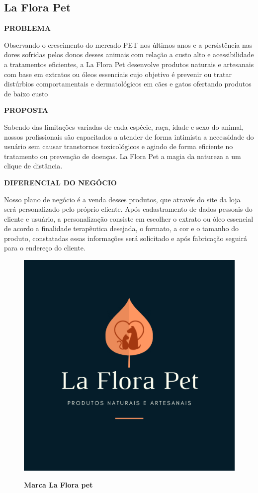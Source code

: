 \subsection{La Flora Pet}

\textbf{PROBLEMA}

Observando o crescimento do mercado PET nos últimos anos e a persistência nas dores sofridas pelos donos desses animais com relação a custo alto e acessibilidade a tratamentos eficientes, a La Flora Pet desenvolve produtos naturais e artesanais com base em extratos ou óleos essenciais cujo objetivo é prevenir ou tratar distúrbios comportamentais e dermatológicos em cães e gatos ofertando produtos de baixo custo

\textbf{PROPOSTA}

Sabendo das limitações variadas de cada espécie, raça, idade e sexo do animal, nossos profissionais são capacitados a atender de forma intimista a necessidade do usuário sem causar transtornos toxicológicos e agindo de forma eficiente no tratamento ou prevenção de doenças. La Flora Pet a magia da natureza a um clique de distância.

\textbf{DIFERENCIAL DO NEGÓCIO} 

Nosso plano de negócio é a venda desses produtos, que através do site da loja será personalizado pelo próprio cliente. Após cadastramento de dados pessoais do cliente e usuário, a personalização consiste em escolher o extrato ou óleo essencial de acordo a finalidade terapêutica desejada, o formato, a cor e o tamanho do produto, constatadas essas informações será solicitado e após fabricação seguirá para o endereço do cliente.


\begin{figure}[!htb]
\centering
\caption{\textbf{Marca La Flora pet}}
\includegraphics[scale=4.5]{Imagens/laflorapet.png}
\label{figura_24}
\end{figure}
\newpage




